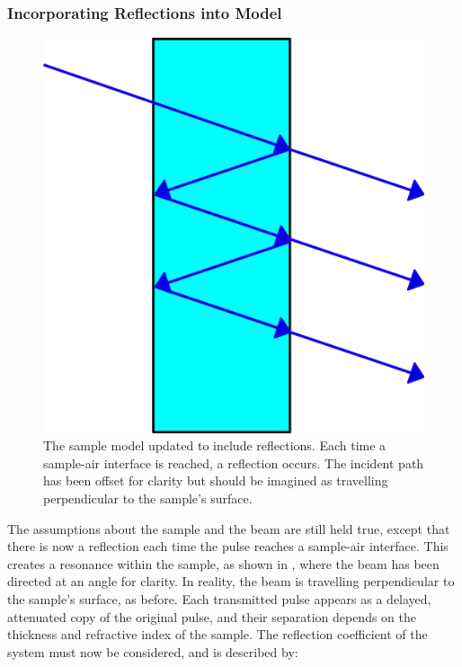 \subsubsection{Incorporating Reflections into Model}
\begin{figure}
    \centering
    \includegraphics{Figures/Misc/Theory/TransferModel_Resonance.png}
    \captionsetup{font = footnotesize, justification = centering}
    \caption[The Sample Model updated to include Reflections]{The sample model updated to include reflections. Each time a sample-air interface is reached, a reflection occurs. The incident path has been offset for clarity but should be imagined as travelling perpendicular to the sample’s surface.}
    \label{fig:transferreflections}
\end{figure}

The assumptions about the sample and the beam are still held true, except that there is now a reflection each time the pulse reaches a sample-air interface. This creates a resonance within the sample, as shown in , where the beam has been directed at an angle for clarity. In reality, the beam is travelling perpendicular to the sample’s surface, as before. Each transmitted pulse appears as a delayed, attenuated copy of the original pulse, and their separation depends on the thickness and refractive index of the sample. The reflection coefficient of the system must now be considered, and is described by:

